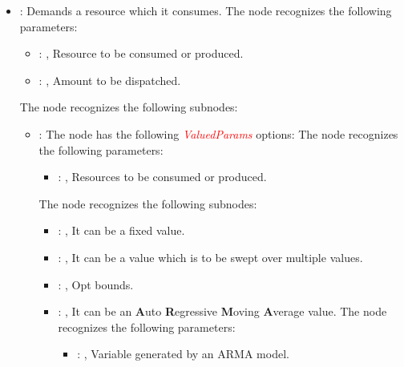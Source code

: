 \begin{itemize}
    \item {}:
      Demands a resource which it consumes.
      The  node recognizes the following parameters:
        \begin{itemize}
          \item {}: , 
            Resource to be consumed or produced.
          \item {}: , 
            Amount to be dispatched.
      \end{itemize}

      The  node recognizes the following subnodes:
      \begin{itemize}
        \item {}:
          The node  has the following \textcolor{red}{\textit{ValuedParams}}
          options:
          The  node recognizes the following parameters:
            \begin{itemize}
              \item {}: , 
                Resources to be consumed or produced.
          \end{itemize}

          The  node recognizes the following subnodes:
          \begin{itemize}
            \item {}: , 
              It can be a fixed value.

            \item {}: , 
              It can be a value which is to be swept over multiple values.

            \item {}: , 
              Opt bounds.

            \item {}: , 
              It can be an \textbf{A}uto \textbf{R}egressive \textbf{M}oving \textbf{A}verage value.
              The  node recognizes the following parameters:
                \begin{itemize}
                  \item {}: , 
                    Variable generated by an ARMA model.
              \end{itemize}


\end{itemize}
\end{itemize}
\end{itemize}
